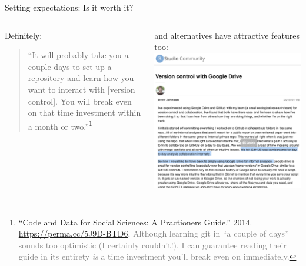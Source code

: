 \documentclass[ignorenonframetext, 10pt, aspectratio=169]{beamer}
\begin{document}
\begin{frame}{Setting expectations: Is it worth it?}

\renewcommand\thempfootnote{\fnsymbol{mpfootnote}}
\vspace{-1cm}
\begin{columns}[T]
\begin{column}{0.5\textwidth}
\begin{minipage}[t]{\linewidth}

Definitely:\\

\begin{quote}
``It will probably take you a couple days to set up a repository and learn how you want to interact with [version control]. You will break even on that time investment within a month or two.''\footnote[2]{\scriptsize ``Code and Data for Social Sciences: A Practioners Guide.'' 2014. \url{https://perma.cc/5J9D-BTD6}.  \textcolor{gray}{Although learning git in ``a couple of days'' sounds too optimistic (I certainly couldn't!), I can guarantee reading their guide in its entirety \emph{is} a time investment you'll break even on immediately.}}\\
\end{quote}

\end{minipage}
\bigskip
\bigskip
\vspace*{\fill}

\end{column}
\begin{column}{0.5\textwidth}
\begin{minipage}[t]{\linewidth}
and alternatives have attractive features too:
\smallskip
\centering
\includegraphics[width = 0.8\linewidth]{github_vs_gdrive.png}
\end{minipage}
\end{column}
\end{columns}
\end{frame}
\end{document}
